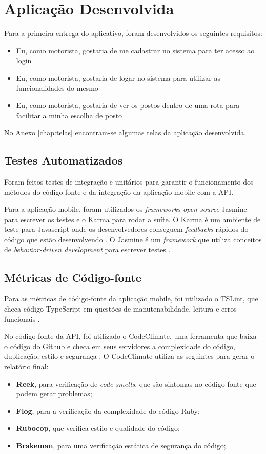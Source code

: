 \section{Aplicação Desenvolvida}
Para a primeira entrega do aplicativo, foram desenvolvidos os seguintes requisitos:
\begin{itemize}
    \item Eu, como motorista, gostaria de me cadastrar no sistema para ter acesso ao login
    \item Eu, como motorista, gostaria de logar no sistema para utilizar as funcionalidades do mesmo
    \item Eu, como motorista, gostaria de ver os postos dentro de uma rota para facilitar a minha escolha de posto
\end{itemize}
No Anexo \ref{chap:telas} encontram-se algumas telas da aplicação desenvolvida.

\subsection{Testes Automatizados}

Foram feitos testes de integração e unitários para garantir o funcionamento dos métodos do código-fonte e da integração da aplicação mobile com a API.

Para a aplicação mobile, foram utilizados os \textit{frameworks open source} Jasmine para escrever os testes e o Karma para rodar a suíte. O Karma é um ambiente de teste para Javascript onde os desenvolvedores conseguem \textit{feedbacks} rápidos do código que estão desenvolvendo \cite{karma}. O Jasmine é um \textit{framework} que utiliza conceitos de \textit{behavior-driven development} para escrever testes \cite{jasmine}.

\subsection{Métricas de Código-fonte}

Para as métricas de código-fonte da aplicação mobile, foi utilizado o TSLint, que checa código TypeScript em questões de manutenabilidade, leitura e erros funcionais \cite{tslint}.

No código-fonte da API, foi utilizado o CodeClimate, uma ferramenta que baixa o código do Github e checa em seus servidores a complexidade do código, duplicação, estilo e segurança \cite{codeclimate}. O CodeClimate utiliza as seguintes para gerar o relatório final:
\begin{itemize}
    \item \textbf{Reek}, para verificação de \textit{code smells}, que são sintomas no código-fonte que podem gerar problemas;
    \item \textbf{Flog}, para a verificação da complexidade do código Ruby;
    \item \textbf{Rubocop}, que verifica estilo e qualidade do código;
    \item \textbf{Brakeman}, para uma verificação estática de segurança do código;
\end{itemize}

